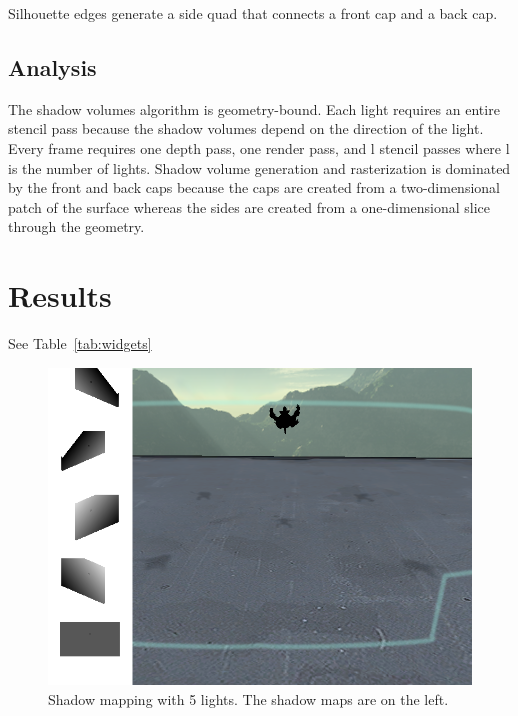 \documentclass[12pt]{article}
\begin{document}
Silhouette edges generate a side quad that connects a front cap and a back cap.

\subsection{Analysis}

The shadow volumes algorithm is geometry-bound. Each light requires an entire stencil pass because the shadow volumes depend on the direction of the light.
Every frame requires one depth pass, one render pass, and l stencil passes where l is the number of lights. Shadow volume generation and rasterization is dominated by the front and back caps because the caps are created from a two-dimensional patch of the surface whereas the sides are created from a one-dimensional slice through the geometry.

\section{Results}

See Table~\ref{tab:widgets}

\begin{figure}
\centering
\includegraphics[scale=0.5]{ArmadilloMaps.png}
\caption{\label{fig:mapping} Shadow mapping with 5 lights. The shadow maps are on the left.}
\end{figure}
\end{document}

